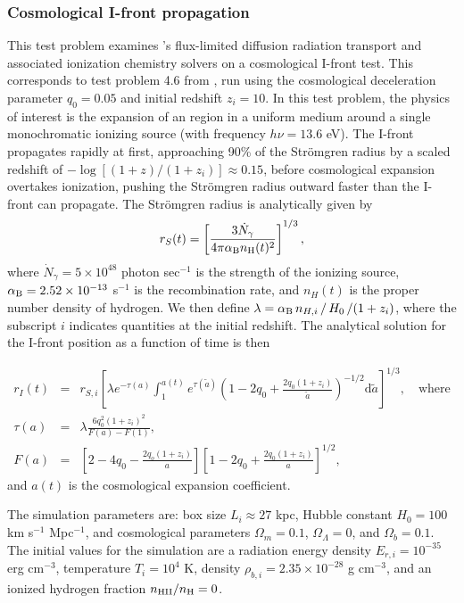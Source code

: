 \subsubsection{Cosmological I-front propagation}
\label{sec.tests.fld}

This test problem examines \enzo's flux-limited diffusion radiation
transport and associated ionization chemistry solvers on a
cosmological I-front test.  This corresponds to test problem 4.6 from
\cite{ReynoldsHayesPaschosNorman2009}, run using the cosmological
deceleration parameter $q_0 = 0.05$ and initial redshift $z_i=10$.  In
this test problem, the physics of interest is the expansion of an
 region in a uniform medium around a single monochromatic
ionizing source (with frequency $h\nu = 13.6$ eV).  The I-front
propagates rapidly at first, approaching 90\% of the Str{\" o}mgren
radius by a scaled redshift of $-\log\left[(1+z)/(1+z_i)\right]
\approx 0.15$, before cosmological expansion overtakes ionization,
pushing the Str{\" o}mgren radius outward faster than the I-front can
propagate.  The Str{\" o}mgren radius is analytically given by
\[
   r_S(t) = \left[\frac{3\dot{N}_{\gamma}}{4\pi \alpha_{\rm B}
   n_{\rm H}(t)^2}\right]^{1/3}, 
\]
where $\dot{N}_{\gamma} = 5 \times 10^{48}$ photon sec$^{-1}$ is the
strength of the ionizing source, $\alpha_{\rm B} = 2.52 \times 10^{-13}$
s$^{-1}$ is the  recombination rate, and $n_H(t)$ is the
proper number density of hydrogen.  We then define $\lambda =
\alpha_{\rm B}\, n_{H,i}\, /\, H_0\, / (1+z_i)$, where the subscript $i$
indicates quantities at the initial redshift.  The analytical
solution for the I-front position as a function of time is then

\begin{eqnarray*}
   r_I(t) &=& r_{S,i} \left[\lambda e^{-\tau(a)} \int_1^{a(t)}
     e^{\tau(\tilde a)} \left(1 - 2q_0
     + \frac{2q_0(1+z_i)}{\tilde{a}}\right)^{-1/2}\mathrm
     d\tilde{a}\right]^{1/3}, \quad\text{where} \\ 
   \tau(a) &=& \lambda\frac{6q_0^2(1+z_i)^2}{F(a)-F(1)}, \\
   F(a) &=& \left[2-4q_0 - \frac{2q_o(1+z_i)}{a}\right] 
      \left[1-2q_0 + \frac{2q_0(1+z_i)}{a}\right]^{1/2},
\end{eqnarray*}
and $a(t)$ is the cosmological expansion coefficient.

The simulation parameters are: box size $L_i\approx 27$ kpc, Hubble
constant $H_0 = 100$ km s$^{-1}$ Mpc$^{-1}$, and cosmological
parameters $\Omega_m = 0.1$, $\Omega_\Lambda=0$, and $\Omega_b = 0.1$.
The initial values for the simulation are a radiation energy density
$E_{r,i} = 10^{-35}$ erg cm$^{-3}$, temperature $T_i = 10^4$ K,
density $\rho_{b,i} = 2.35 \times 10^{-28}$ g cm$^{-3}$, and an
ionized hydrogen fraction $n_{\rm HII}/n_{\rm H} = 0$.


